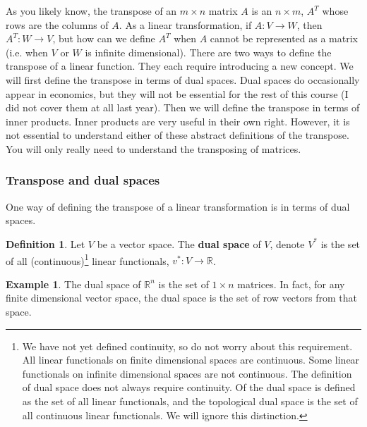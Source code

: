 \documentclass[12pt,reqno]{amsart}
\def\R{\mathbb{R}}
\theoremstyle{definition}
\newtheorem{definition}{Definition}[section]
\newtheorem{example}{Example}[section]
\begin{document}
As you likely know, the transpose of an $m \times n$ matrix $A$ is an
$n \times m$, $A^T$ whose rows are the columns of $A$. As a linear
transformation, if $A: V \to W$, then $A^T: W \to V$, but how can we
define $A^T$ when $A$ cannot be represented as a matrix (i.e. when $V$
or $W$ is infinite dimensional). There are two ways to define the
transpose of a linear function. They each require introducing a new
concept. We will first define the transpose in terms of dual
spaces. Dual spaces do occasionally appear in economics, but they will
not be essential for the rest of this course (I did not cover them at
all last year). Then we will define the transpose in terms of inner
products. Inner products are very useful in their own right. However,
it is not essential to understand either of these abstract definitions
of the transpose. You will only really need to understand the
transposing of matrices.

\subsubsection{Transpose and dual spaces}

One way of defining the transpose of a linear transformation is in
terms of dual spaces.
\begin{definition}
  Let $V$ be a vector space. The \textbf{dual space} of $V$, denote $V^\ast$
  is the set of all (continuous)\footnote{We have not yet defined
    continuity, so do not worry about this requirement. All linear
    functionals on finite dimensional spaces are continuous. Some
    linear functionals on infinite dimensional spaces are not
    continuous. The definition of dual space does not always require
    continuity. Of the dual space is defined as the set of all linear
    functionals, and the topological dual space is the set of all
    continuous linear functionals. We will ignore this distinction.}
  linear functionals, $v^\ast: V \to \R$.
\end{definition}

\begin{example}
  The dual space of $\R^n$ is the set of $1 \times n$ matrices. In
  fact, for any finite dimensional vector space, the dual space is the
  set of row vectors from that space. 
\end{example}
\end{document}
